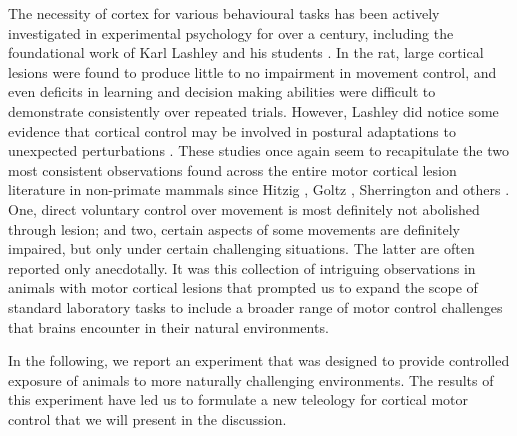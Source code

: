 The necessity of cortex for various behavioural tasks has been actively investigated in experimental psychology for over a century, including the foundational work of Karl Lashley and his students \cite{Lashley1921a,Lashley1950a}. In the rat, large cortical lesions were found to produce little to no impairment in movement control, and even deficits in learning and decision making abilities were difficult to demonstrate consistently over repeated trials. However, Lashley did notice some evidence that cortical control may be involved in postural adaptations to unexpected perturbations \cite{Lashley1921a}. These studies once again seem to recapitulate the two most consistent observations found across the entire motor cortical lesion literature in non-primate mammals since Hitzig \cite{Fritsch1870}, Goltz \cite{Goltz1888}, Sherrington \cite{Sherrington1885} and others \cite{Oakley1979,Terry1989}. One, direct voluntary control over movement is most definitely not abolished through lesion; and two, certain aspects of some movements are definitely impaired, but only under certain challenging situations. The latter are often reported only anecdotally. It was this collection of intriguing observations in animals with motor cortical lesions that prompted us to expand the scope of standard laboratory tasks to include a broader range of motor control challenges that brains encounter in their natural environments.

In the following, we report an experiment that was designed to provide controlled exposure of animals to more naturally challenging environments. The results of this experiment have led us to formulate a new teleology for cortical motor control that we will present in the discussion.

